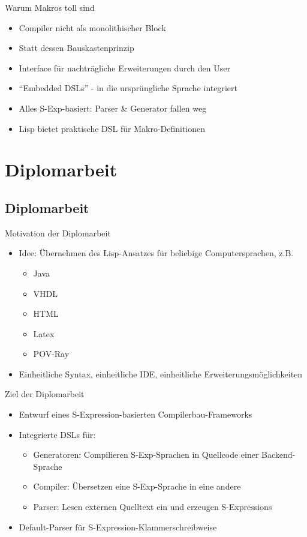 \documentclass{beamer}
\newcommand{\pfeil}{\item[$\Rightarrow$]}
\begin{document}
\begin{frame}{Warum Makros toll sind}
  \begin{itemize}
  \item Compiler nicht als monolithischer Block
  \item Statt dessen Bauskastenprinzip
  \item Interface für nachträgliche Erweiterungen durch den User
  \item ``Embedded DSLs'' - in die ursprüngliche Sprache integriert
  \item Alles S-Exp-basiert: Parser \& Generator fallen weg
  \item Lisp bietet praktische DSL für Makro-Definitionen 
  \end{itemize}
\end{frame}

\section{Diplomarbeit}
\subsection{Diplomarbeit}

\begin{frame}{Motivation der Diplomarbeit}
  \begin{itemize}
  \item Idee: Übernehmen des Lisp-Ansatzes für beliebige Computersprachen, z.B.
    \begin{itemize}
    \item Java
    \item VHDL
    \item HTML
    \item Latex
    \item POV-Ray
    \end{itemize}
  \pfeil Einheitliche Syntax, einheitliche IDE, einheitliche Erweiterungsmöglichkeiten
\end{itemize}
\end{frame}

\begin{frame}{Ziel der Diplomarbeit}
  \begin{itemize}
  \item Entwurf eines S-Expression-basierten Compilerbau-Frameworks
  \item Integrierte DSLs für:
    \begin{itemize}
    \item Generatoren: Compilieren S-Exp-Sprachen in Quellcode einer Backend-Sprache
    \item Compiler: Übersetzen eine S-Exp-Sprache in eine andere
    \item Parser: Lesen externen Quelltext ein und erzeugen S-Expressions
    \end{itemize}
  \item Default-Parser für S-Expression-Klammerschreibweise
  \end{itemize}
\end{frame}
\end{document}

